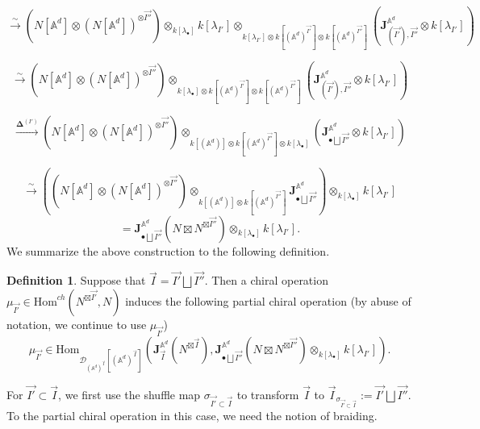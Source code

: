 \documentclass[11pt]{amsart}
\theoremstyle{definition}
\newtheorem{defn}[thm]{Definition}
\theoremstyle{remark}
\numberwithin{equation}{section}
\begin{document}
$$
\xrightarrow{\sim}\left(N[\mathbb{A}^d]\otimes(N[\mathbb{A}^d])^{\otimes \vec{I''}}\right)\otimes_{k[\lambda_{\bullet}]}k[\lambda_{I'}]\otimes_{k[\lambda_{I'}]\otimes k[(\mathbb{A}^d)^{\vec{I'}}]\otimes k[(\mathbb{A}^d)^{\vec{I''}}]}\left(\mathbf{J}_{(\vec{I'}),\vec{{I''}}}^{\mathbb{A}^d}\otimes k[\lambda_{I'}]\right)
$$

$$
\xrightarrow{\sim}\left(N[\mathbb{A}^d]\otimes(N[\mathbb{A}^d])^{\otimes \vec{I''}}\right)\otimes_{k[\lambda_{\bullet}]\otimes k[(\mathbb{A}^d)^{\vec{I'}}]\otimes k[(\mathbb{A}^d)^{\vec{I''}}]}\left(\mathbf{J}_{(\vec{I'}),\vec{{I''}}}^{\mathbb{A}^d}\otimes k[\lambda_{I'}]\right)
$$

$$
\xrightarrow{\mathbf{\Delta}^{(I')}}\left(N[\mathbb{A}^d]\otimes(N[\mathbb{A}^d])^{\otimes \vec{I''}}\right)\otimes_{k[(\mathbb{A}^d)]\otimes k[(\mathbb{A}^d)^{\vec{I''}}]\otimes k[\lambda_{\bullet}]}\left(\mathbf{J}_{\bullet\bigsqcup\vec{{I''}}}^{\mathbb{A}^d}\otimes k[\lambda_{I'}]\right)
$$


$$
\xrightarrow{\sim}\left((N[\mathbb{A}^d]\otimes(N[\mathbb{A}^d])^{\otimes \vec{I''}})\otimes_{k[(\mathbb{A}^d)]\otimes k[(\mathbb{A}^d)^{\vec{I''}}]}\mathbf{J}_{\bullet\bigsqcup\vec{{I''}}}^{\mathbb{A}^d}\right)\otimes_{k[\lambda_{\bullet}]} k[\lambda_{I'}]
$$
$$
=\mathbf{J}_{\bullet\bigsqcup\vec{I''}}^{\mathbb{A}^d}(N\boxtimes N^{\boxtimes\vec{I''}})\otimes_{k[\lambda_{\bullet}]}k[\lambda_{I'}].
$$
We summarize the above construction to the following definition.
\begin{defn}

Suppose that $\vec{I}=\vec{I'}\bigsqcup\vec{I''}$. Then a chiral operation $\mu_{\vec{I'}}\in   \mathrm{Hom}^{ch}(N^{\boxtimes\vec{I'}},N)$ induces the following partial chiral operation (by abuse of notation, we continue to use $\mu_{\vec{I'}}$)
$$
\mu_{\vec{I'}}\in \mathrm{Hom}_{\mathcal{D}_{(\mathbb{A}^d)^{\vec{I}}}[(\mathbb{A}^d)^{\vec{I}}]}\left(\mathbf{J}^{\mathbb{A}^d}_{\vec{I}}(N^{\boxtimes\vec{I}}),\mathbf{J}_{\bullet\bigsqcup\vec{I''}}^{\mathbb{A}^d}(N\boxtimes N^{\boxtimes\vec{I''}})\otimes_{k[\lambda_{\bullet}]}k[\lambda_{I'}]\right).
$$
\end{defn}


For $\vec{I'}\subset \vec{I}$, we first use the shuffle map $\sigma_{\vec{I'}\subset\vec{I}}$ to transform $\vec{I}$ to $\vec{I}_{\sigma_{\vec{I'}\subset\vec{I}}}:=\vec{I'}\bigsqcup \vec{I''}$. To the partial chiral operation in this case, we need the notion of braiding.
\end{document}
